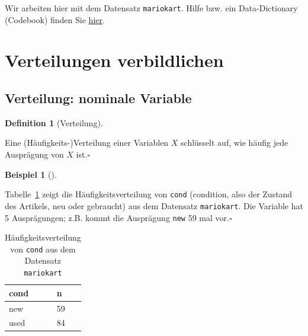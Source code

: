 \documentclass[
  letterpaper,
]{scrbook}
\theoremstyle{definition}
\newtheorem{example}{Beispiel}[chapter]
\theoremstyle{definition}
\newtheorem{definition}{Definition}[chapter]
\theoremstyle{definition}
\theoremstyle{remark}
\begin{document}
\begin{tcolorbox}[enhanced jigsaw, colbacktitle=quarto-callout-note-color!10!white, coltitle=black, bottomrule=.15mm, rightrule=.15mm, arc=.35mm, toptitle=1mm, colframe=quarto-callout-note-color-frame, opacitybacktitle=0.6, left=2mm, leftrule=.75mm, breakable, opacityback=0, bottomtitle=1mm, titlerule=0mm, title=\textcolor{quarto-callout-note-color}{\faInfo}\hspace{0.5em}{Hinweis}, colback=white, toprule=.15mm]

Wir arbeiten hier mit dem Datensatz \texttt{mariokart}. Hilfe bzw. ein
Data-Dictionary (Codebook) finden Sie
\href{https://www.rdocumentation.org/packages/openintro/versions/2.4.0/topics/mariokart}{hier}.

\end{tcolorbox}

\section{Verteilungen verbildlichen}\label{verteilungen-verbildlichen}

\subsection{Verteilung: nominale
Variable}\label{verteilung-nominale-variable}

\begin{definition}[Verteilung]\protect\hypertarget{def-verteilung}{}\label{def-verteilung}

Eine (Häufigkeits-)Verteilung einer Variablen \(X\) schlüsselt auf, wie
häufig jede Ausprägung von \(X\) ist.\(\square\)

\end{definition}

\begin{example}[]\protect\hypertarget{exm-verteilung1}{}\label{exm-verteilung1}

Tabelle~\ref{tbl-wheels-n} zeigt die Häufigkeitsverteilung von
\texttt{cond} (condition, also der Zustand des Artikels, neu oder
gebraucht) aus dem Datensatz \texttt{mariokart}. Die Variable hat 5
Ausprägungen; z.B. kommt die Ausprägung \texttt{new} 59 mal
vor.\(\square\)

\end{example}

\begin{longtable}[]{@{}ll@{}}

\caption{\label{tbl-wheels-n}Häufigkeitsverteilung von \texttt{cond} aus
dem Datensatz \texttt{mariokart}}

\tabularnewline

\toprule\noalign{}
cond & n \\
\midrule\noalign{}
\endhead
\bottomrule\noalign{}
\endlastfoot
new & 59 \\
used & 84 \\

\end{longtable}
\end{document}
